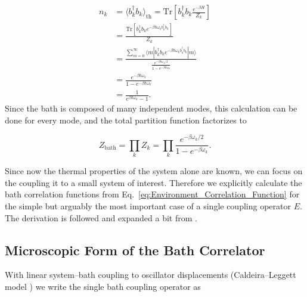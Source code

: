 \begin{align} \label{eq:ho_expectation_number_operator}
        n_k & = \langle b_k^{\dagger} b_k \rangle_{\text{th}} = \mathrm{Tr} \left[ b_k^{\dagger} b_k \frac{e^{-\beta H}}{Z_k} \right]\\
                                           & = \frac{\mathrm{Tr} \left[ b_k^{\dagger} b_k e^{-\beta \hbar \omega_k b_k^{\dagger} b_k} \right]}{Z_k}\\
                                           & = \frac{\sum_{m=0}^{\infty} \langle m|b_k^{\dagger} b_k e^{-\beta \hbar \omega_k b_k^{\dagger} b_k}|m \rangle}{\frac{e^{-\beta \hbar \omega_k / 2}}{1 - e^{-\beta \hbar \omega_k}}} \\%
            & = \frac{e^{-\beta \hbar \omega_k}}{1 - e^{-\beta \hbar \omega_k}}\\
            & = \frac{1}{e^{\beta \hbar \omega_k} - 1}.
\end{align}
\vspace{1em}
\noindent
Since the bath is composed of many independent modes, this calculation can be done for every mode, and the total partition function factorizes to

\begin{equation} \label{eq:ho_generalized_partition_function}
	Z_{\text{bath}} = \prod_k Z_k = \prod_k \frac{e^{-\beta \omega_k /2}}{1 - e^{-\beta \omega_k}}.
\end{equation}

\noindent
Since now the thermal properties of the system alone are known, we can focus on the coupling it to a small system of interest. Therefore we explicitly calculate the bath correlation functions from Eq.~\eqref{eq:Environment_Correlation_Function} for the simple but arguably the most important case of a single coupling operator $E$. The derivation is followed and expanded a bit from \cite{thingnasteadystatetransportproperties}.



\subsection{Microscopic Form of the Bath Correlator}
\label{subsec:microscopic_bath_correlator}

\noindent
With linear system--bath coupling to oscillator displacements (Caldeira--Leggett model \cite{hagstrommorrison2011caldeiraleggettmodel}) we write the single bath coupling operator as

